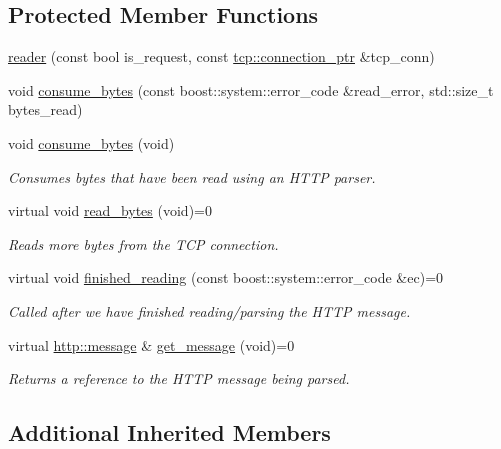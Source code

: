 \subsection*{Protected Member Functions}
\begin{DoxyCompactItemize}
\item 
\hyperlink{classpion_1_1http_1_1reader_af9bdf6ead8b5caeae1d481e418e4dddc}{reader} (const bool is\-\_\-request, const \hyperlink{namespacepion_1_1tcp_a6c9b7497068009f6d81d95ec0b0627d6}{tcp\-::connection\-\_\-ptr} \&tcp\-\_\-conn)
\item 
void \hyperlink{classpion_1_1http_1_1reader_afd7a8af3a502d6863ef5c2166d3d7208}{consume\-\_\-bytes} (const boost\-::system\-::error\-\_\-code \&read\-\_\-error, std\-::size\-\_\-t bytes\-\_\-read)
\item 
void \hyperlink{classpion_1_1http_1_1reader_acc3496a25c7bd1fb3ecc704ed752b190}{consume\-\_\-bytes} (void)
\begin{DoxyCompactList}\small\item\em Consumes bytes that have been read using an H\-T\-T\-P parser. \end{DoxyCompactList}\item 
virtual void \hyperlink{classpion_1_1http_1_1reader_a8a3b9767dc84fd1a6ee0e1558ec3d76e}{read\-\_\-bytes} (void)=0
\begin{DoxyCompactList}\small\item\em Reads more bytes from the T\-C\-P connection. \end{DoxyCompactList}\item 
virtual void \hyperlink{classpion_1_1http_1_1reader_ae7d3818810df72a7d2895ff1f767be9b}{finished\-\_\-reading} (const boost\-::system\-::error\-\_\-code \&ec)=0
\begin{DoxyCompactList}\small\item\em Called after we have finished reading/parsing the H\-T\-T\-P message. \end{DoxyCompactList}\item 
virtual \hyperlink{classpion_1_1http_1_1message}{http\-::message} \& \hyperlink{classpion_1_1http_1_1reader_a6186ceb636d352cae97c33fe105bd9a3}{get\-\_\-message} (void)=0
\begin{DoxyCompactList}\small\item\em Returns a reference to the H\-T\-T\-P message being parsed. \end{DoxyCompactList}\end{DoxyCompactItemize}
\subsection*{Additional Inherited Members}


